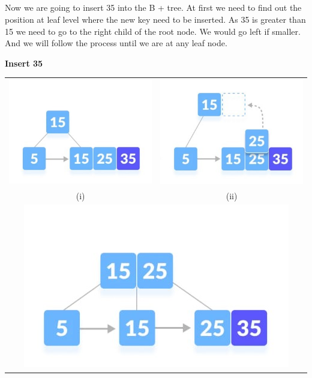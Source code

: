 \documentclass{article}
\begin{document}
        \subsection*{}
        Now we are going to insert 35 into the B + tree. At first we need to find out the position at leaf level where the new key need to be inserted. As 35 is greater than 15 we need to go to the right child of the root node. We would go left if smaller. And we will follow the process until we are at any leaf node. 
        \begin{center}
            \color{red}\textbf{Insert 35}  
        \end{center}
        \begin{table}[ht]
            \centering
            \begin{tabular}{c c}
                    \includegraphics[scale=0.9]{Images/bi4_1_1.jpg} &\includegraphics[scale=0.9]{Images/bi4_1_2.jpg}\\
                ({\color{red}i}) &({\color{red}ii}) \\
                    \multicolumn{2}{c}{\includegraphics[scale=0.9]{Images/bi4_2.jpg}}\\

\end{tabular}
\end{table}
\end{document}
